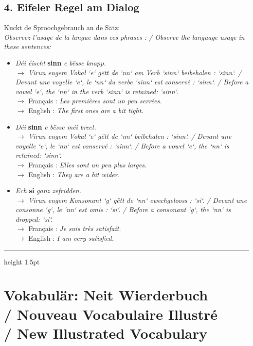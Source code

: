 \subsection*{4. Eifeler Regel am Dialog}
Kuckt de Sproochgebrauch an de Sätz: \\
\textit{Observez l'usage de la langue dans ces phrases : / Observe the language usage in these sentences:}

\begin{itemize}
    \item \textit{Déi éischt} \textbf{sinn} \textit{e bësse knapp.} \\
    $\rightarrow$ \textit{Virun engem Vokal `e` gëtt de `nn` am Verb `sinn` beibehalen : `sinn`. / Devant une voyelle `e`, le `nn` du verbe `sinn` est conservé : `sinn`. / Before a vowel `e`, the `nn` in the verb `sinn` is retained: `sinn`.} \\
    $\rightarrow$ Français : \textit{Les premières sont un peu serrées.} \\
    $\rightarrow$ English : \textit{The first ones are a bit tight.}
    
    \item \textit{Déi} \textbf{sinn} \textit{e bësse méi breet.} \\
    $\rightarrow$ \textit{Virun engem Vokal `e` gëtt de `nn` beibehalen : `sinn`. / Devant une voyelle `e`, le `nn` est conservé : `sinn`. / Before a vowel `e`, the `nn` is retained: `sinn`.} \\
    $\rightarrow$ Français : \textit{Elles sont un peu plus larges.} \\
    $\rightarrow$ English : \textit{They are a bit wider.}
    
    \item \textit{Ech} \textbf{si} \textit{ganz zefridden.} \\
    $\rightarrow$ \textit{Virun engem Konsonant `g` gëtt de `nn` ewechgelooss : `si`. / Devant une consonne `g`, le `nn` est omis : `si`. / Before a consonant `g`, the `nn` is dropped: `si`.} \\
    $\rightarrow$ Français : \textit{Je suis très satisfait.} \\
    $\rightarrow$ English : \textit{I am very satisfied.}
\end{itemize}

\vspace{1.5cm}
\color{geminiBlue}\hrule height 1.5pt \vspace{0.5em}\color{black}
\section[Vokabulär: Neit Wierderbuch]{Vokabulär: Neit Wierderbuch \\/ Nouveau Vocabulaire Illustré \\/ New Illustrated Vocabulary}

